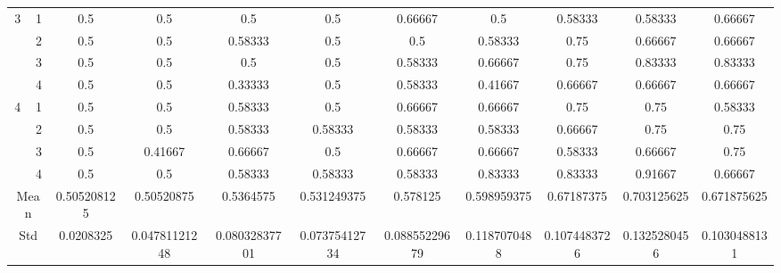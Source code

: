 \documentclass[draft,dvipsnames]{drexel-thesis}
\begin{document}
\begin{thesis}
\begin{table}[!t]
{\begin{tabular}{|c|c|c|c|c|c|c|c|c|c|c|}
\multirow{4}{*}{3}    & 1                   & 0.5         & 0.5           & 0.5           & 0.5           & 0.66667       & 0.5          & 0.58333      & 0.58333      & 0.66667      \\ \cline{2-11} 
                      & 2                   & 0.5         & 0.5           & 0.58333       & 0.5           & 0.5           & 0.58333      & 0.75         & 0.66667      & 0.66667      \\ \cline{2-11} 
                      & 3                   & 0.5         & 0.5           & 0.5           & 0.5           & 0.58333       & 0.66667      & 0.75         & 0.83333      & 0.83333      \\ \cline{2-11} 
                      & 4                   & 0.5         & 0.5           & 0.33333       & 0.5           & 0.58333       & 0.41667      & 0.66667      & 0.66667      & 0.66667      \\ \hline
\multirow{4}{*}{4}    & 1                   & 0.5         & 0.5           & 0.58333       & 0.5           & 0.66667       & 0.66667      & 0.75         & 0.75         & 0.58333      \\ \cline{2-11} 
                      & 2                   & 0.5         & 0.5           & 0.58333       & 0.58333       & 0.58333       & 0.58333      & 0.66667      & 0.75         & 0.75         \\ \cline{2-11} 
                      & 3                   & 0.5         & 0.41667       & 0.66667       & 0.5           & 0.66667       & 0.66667      & 0.58333      & 0.66667      & 0.75         \\ \cline{2-11} 
                      & 4                   & 0.5         & 0.5           & 0.58333       & 0.58333       & 0.58333       & 0.83333      & 0.83333      & 0.91667      & 0.66667      \\ \hline
\multicolumn{2}{|c|}{Mean}                  & 0.505208125 & 0.50520875    & 0.5364575     & 0.531249375   & 0.578125      & 0.598959375  & 0.67187375   & 0.703125625  & 0.671875625  \\ \hline
\multicolumn{2}{|c|}{Std}                   & 0.0208325   & 0.04781121248 & 0.08032837701 & 0.07375412734 & 0.08855229679 & 0.1187070488 & 0.1074483726 & 0.1325280456 & 0.1030488131 \\ \hline
\end{tabular}}
\end{table}


\end{thesis}
\end{document}
